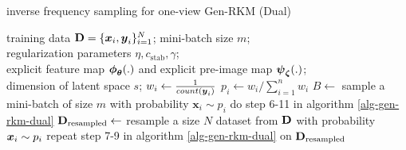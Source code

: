 \begin{algorithm}[H]
\caption{inverse frequency sampling for one-view Gen-RKM (Dual)}
\label{alg-invs-rkm}
\begin{algorithmic}[1]
\Require training data $\mathbf{D} = \{\boldsymbol{x}_i, \boldsymbol{y}_i\}_{i=1}^{N}$; mini-batch size $m$; \\
regularization parameters $\eta, c_{\text{stab}}, \gamma$; \\
explicit feature map $\boldsymbol{\phi}_{\boldsymbol{\theta}}(.)$ and explicit pre-image map $\boldsymbol{\psi}_{\boldsymbol{\zeta}}(.)$; \\
dimension of latent space $s$;
\State $w_i \gets \frac{1}{count(\boldsymbol{y}_i)}$ 
\State $p_i \gets w_i / \sum_{i=1}^n w_i$
        \State $B \gets$ sample a mini-batch of size $m$ with probability $\boldsymbol{x}_i \sim p_i$ 
        \State do step 6-11 in algorithm \ref{alg-gen-rkm-dual}
        \EndFor
    \EndFor
{}
\State $\mathbf{D}_{\text{resampled}} \gets$ resample a size $N$ dataset from $\mathbf{D}$ with probability $\boldsymbol{x}_i \sim p_i$ 
\State repeat step 7-9 in algorithm \ref{alg-gen-rkm-dual}  on $\mathbf{D}_{\text{resampled}}$
\end{algorithmic}
\end{algorithm}